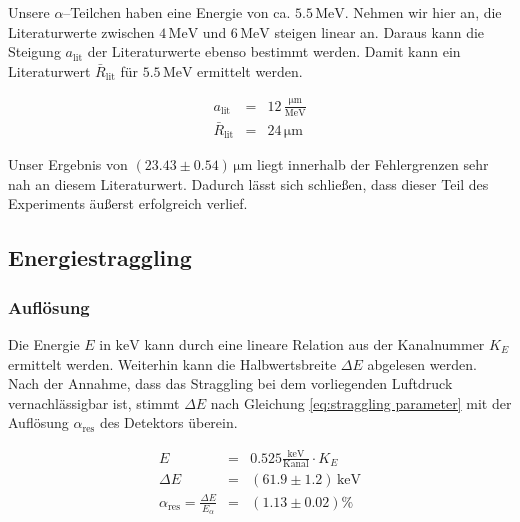 \documentclass[12pt,a4paper]{scrartcl}
\numberwithin{equation}{section} %
\begin{document}
Unsere $\alpha$--Teilchen haben eine Energie von ca. $5.5 \mathrm{\, MeV}$. Nehmen wir hier an, die Literaturwerte zwischen $4 \mathrm{\, MeV}$ und $6 \mathrm{\, MeV}$ steigen linear an. Daraus kann die Steigung $a_\mathrm{lit}$ der Literaturwerte ebenso bestimmt werden. Damit kann ein Literaturwert  $\bar R_\mathrm{lit}$ für $5.5 \mathrm{\, MeV}$ ermittelt werden.

\begin{eqnarray}
	a_\mathrm{lit} &=& 12 \mathrm{\, \frac{\mu m}{MeV}} \\
	\bar R_\mathrm{lit} &=& 24 \mathrm{\, \mu m}
\end{eqnarray}

\noindent
Unser Ergebnis von $(23.43 \pm 0.54) \mathrm{\, \mu m}$ liegt innerhalb der Fehlergrenzen sehr nah an diesem Literaturwert. Dadurch lässt sich schließen, dass dieser Teil des Experiments äußerst erfolgreich verlief.

\hypertarget{energiestraggling-1}{%
	\subsection{Energiestraggling}\label{energiestraggling-1}}

\hypertarget{energiestraggling-aufloesung}{%
	\subsubsection{Auflösung}\label{energiestraggling-aufloesung}}
Die Energie $E$ in $\mathrm{keV}$ kann durch eine lineare Relation aus der Kanalnummer $K_E$ ermittelt werden. Weiterhin kann die Halbwertsbreite $\Delta E$ abgelesen werden. Nach der Annahme, dass das Straggling bei dem vorliegenden Luftdruck vernachlässigbar ist, stimmt $\Delta E$ nach Gleichung \eqref{eq:straggling parameter} mit der Auflösung $\alpha_\mathrm{res}$ des Detektors überein.

\begin{eqnarray}
	E &=& 0.525 \mathrm{\frac{keV}{Kanal }} \cdot K_E \label{eq:Kanal zu Energie}\\
	\Delta E &=& (61.9 \pm 1.2) \mathrm{\,keV} \label{eq:Halbwertsbreite} \\
	\alpha_\mathrm{res} = \frac{\Delta E}{E_\alpha} &=& (1.13 \pm 0.02) \%
\end{eqnarray}
\end{document}
